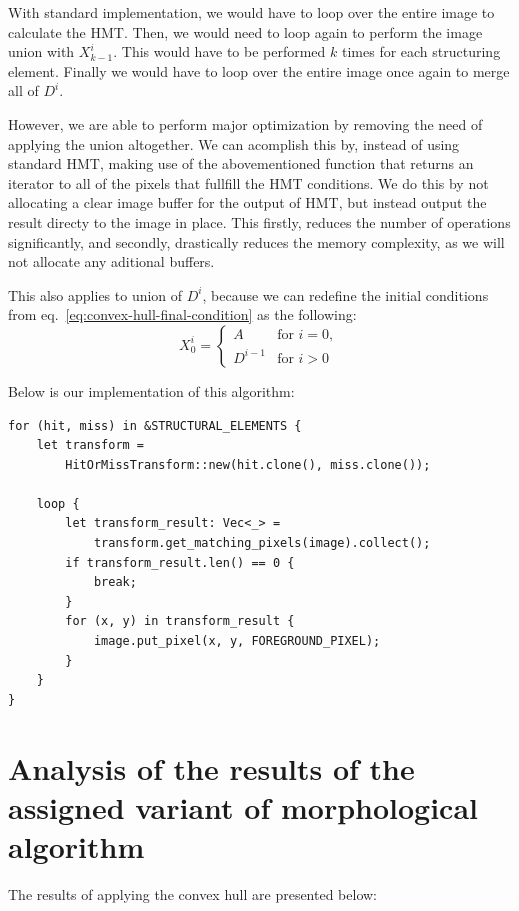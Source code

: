 \documentclass[12pt]{article}
\begin{document}
With standard implementation, we would have to loop over the entire image to calculate the HMT.
Then, we would need to loop again to perform the image union with $X^i_{k-1}$.
This would have to be performed $k$ times for each structuring element.
Finally we would have to loop over the entire image once again to merge all of $D^i$.

However, we are able to perform major optimization by removing the need of applying the union altogether.
We can acomplish this by, instead of using standard HMT, making use of the abovementioned function that returns an iterator to all of the pixels that fullfill the HMT conditions.
We do this by not allocating a clear image buffer for the output of HMT, but instead output the result directy to the image in place.
This firstly, reduces the number of operations significantly, and secondly, drastically reduces the memory complexity, as we will not allocate any aditional buffers.

This also applies to union of $D^i$, because we can redefine the initial conditions from eq.~\eqref{eq:convex-hull-final-condition} as the following:
\begin{equation*}
    X^i_0 =
    \begin{cases}
        A       & \text{for $i = 0$}, \\
        D^{i-1} & \text{for $i > 0$}
    \end{cases}
\end{equation*}

\pagebreak[2]
Below is our implementation of this algorithm:
\begin{lstlisting}
for (hit, miss) in &STRUCTURAL_ELEMENTS {
    let transform = 
        HitOrMissTransform::new(hit.clone(), miss.clone());

    loop {
        let transform_result: Vec<_> = 
            transform.get_matching_pixels(image).collect();
        if transform_result.len() == 0 {
            break;
        }
        for (x, y) in transform_result {
            image.put_pixel(x, y, FOREGROUND_PIXEL);
        }
    }
}
\end{lstlisting}

\section{Analysis of the results of the assigned variant of morphological algorithm}

The results of applying the convex hull are presented below:
\end{document}
